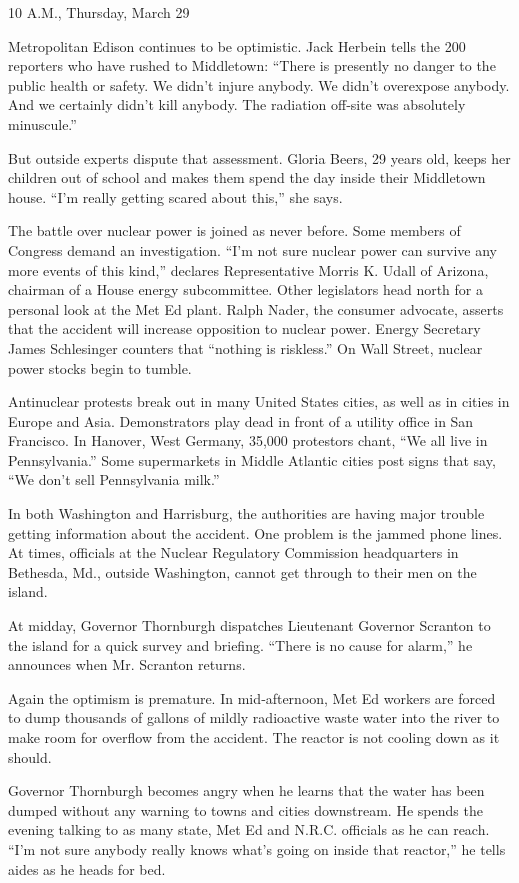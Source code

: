 10 A.M., Thursday, March 29

Metropolitan Edison continues to be optimistic. Jack Herbein tells the
200 reporters who have rushed to Middletown: ``There is presently no
danger to the public health or safety. We didn't injure anybody. We
didn't overexpose anybody. And we certainly didn't kill anybody. The
radiation off‐site was absolutely minuscule.''

But outside experts dispute that assessment. Gloria Beers, 29 years old,
keeps her children out of school and makes them spend the day inside
their Middletown house. ``I'm really getting scared about this,'' she
says.

The battle over nuclear power is joined as never before. Some members of
Congress demand an investigation. ``I'm not sure nuclear power can
survive any more events of this kind,'' declares Representative Morris
K. Udall of Arizona, chairman of a House energy subcommittee. Other
legislators head north for a personal look at the Met Ed plant. Ralph
Nader, the consumer advocate, asserts that the accident will increase
opposition to nuclear power. Energy Secretary James Schlesinger counters
that ``nothing is riskless.'' On Wall Street, nuclear power stocks begin
to tumble.

Antinuclear protests break out in many United States cities, as well as
in cities in Europe and Asia. Demonstrators play dead in front of a
utility office in San Francisco. In Hanover, West Germany, 35,000
protestors chant, ``We all live in Pennsylvania.'' Some supermarkets in
Middle Atlantic cities post signs that say, ``We don't sell Pennsylvania
milk.''

In both Washington and Harrisburg, the authorities are having major
trouble getting information about the accident. One problem is the
jammed phone lines. At times, officials at the Nuclear Regulatory
Commission headquarters in Bethesda, Md., outside Washington, cannot get
through to their men on the island.

At midday, Governor Thornburgh dispatches Lieutenant Governor Scranton
to the island for a quick survey and briefing. ``There is no cause for
alarm,'' he announces when Mr. Scranton returns.

Again the optimism is premature. In mid‐afternoon, Met Ed workers are
forced to dump thousands of gallons of mildly radioactive waste water
into the river to make room for overflow from the accident. The reactor
is not cooling down as it should.

Governor Thornburgh becomes angry when he learns that the water has been
dumped without any warning to towns and cities downstream. He spends the
evening talking to as many state, Met Ed and N.R.C. officials as he can
reach. ``I'm not sure anybody really knows what's going on inside that
reactor,'' he tells aides as he heads for bed.

